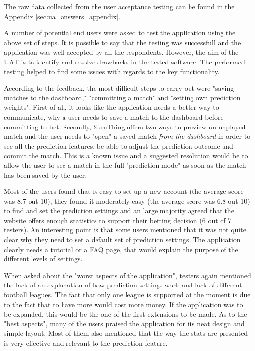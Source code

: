 The raw data collected from the user acceptance testing can be found in the Appendix \ref{sec:ua_answers_appendix}. 

A number of potential end users were asked to test the application using the above set of steps. It is possible to say that the testing was successfull and the application was well accepted by all the respondents. However, the aim of the UAT is to identify and resolve drawbacks in the tested software. The performed testing helped to find some issues with regards to the key functionality. 

According to the feedback, the most difficult steps to carry out were "saving matches to the dashboard," "committing a match" and "setting own prediction weights". First of all, it looks like the application needs a better way to communicate, why a user needs to save a match to the dashboard before committing to bet. Secondly, SureThing offers two ways to preview an unplayed match and the user needs to "open" a saved match \emph{from the dashboard} in order to see all the prediction features, be able to adjust the prediction outcome and commit the match. This is a known issue and a suggested resolution would be to allow the user to see a match in the full "prediction mode" as soon as the match has been saved by the user.

Most of the users found that it easy to set up a new account (the average score was 8.7 out 10), they found it moderately easy (the average score was 6.8 out 10) to find and set the prediction settings and an large majority agreed that the website offers enough statistics to support their betting decision (6 out of 7 testers). An interesting point is that some users mentioned that it was not quite clear why they need to set a default set of prediction settings. The application clearly needs a tutorial or a FAQ page, that would explain the purpose of the different levels of settings. 

When asked about the "worst aspects of the application", testers again mentioned the lack of an explanation of how prediction settings work and lack of different football leagues. The fact that only one league is supported at the moment is due to the fact that to have more would cost more money. If the application was to be expanded, this would be the one of the first extensions to be made. As to the "best aspects", many of the users praised the application for its neat design and simple layout. Most of them also mentioned that the way the stats are presented is very effective and relevant to the prediction feature.

